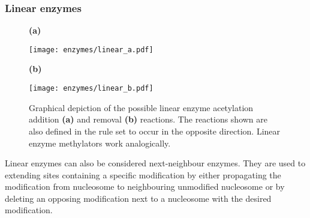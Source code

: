             \subsubsection*{Linear enzymes}
                \begin{figure}[htpb!]
                    \centering
                    \begin{minipage}{0.91\textwidth}
                        \begin{minipage}{0.1\textwidth}
                            \caption*{\small \textbf{(a)}}
                        \end{minipage}
                        \begin{minipage}{0.8\textwidth}
                            \texttt{[image: enzymes/linear\_a.pdf]}
                        \end{minipage}
                    \end{minipage}
                    \begin{minipage}{0.91\textwidth}
                        \begin{minipage}{0.1\textwidth}
                            \caption*{\small \textbf{(b)}}
                        \end{minipage}
                        \begin{minipage}{0.8\textwidth}
                            \texttt{[image: enzymes/linear\_b.pdf]}
                        \end{minipage}
                    \end{minipage}
                    \caption{Graphical depiction of the possible linear enzyme acetylation addition \textbf{(a)} and removal \textbf{(b)} reactions. The reactions shown are also defined in the rule set to occur in the opposite direction. Linear enzyme methylators work analogically.}
                    \label{img:linearEnzymes}
                \end{figure}
                Linear enzymes can also be considered next-neighbour enzymes. They are used to extending sites containing a specific modification by either propagating the modification from nucleosome to neighbouring unmodified nucleosome or by deleting an opposing modification next to a nucleosome with the desired modification.
